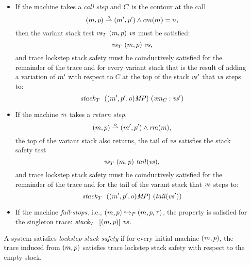 \documentclass[acmsmall,review,anonymous]{acmart}\settopmatter{printfolios=true,printccs=false,printacmref=false}
\begin{document}
{\begin{itemize}
\item
  If the machine takes a \emph{call step} and $C$ is the contour at
  the call
  \[(m, p) \overset{o}{\rightharpoonup} (m', p') \wedge cm(m) = n,\]
%
  then the variant stack test $\mathit{\mathit{vs}}_T ~ (m, p) ~ \mathit{vs}$ must be
  satisfied:
  \[\mathit{\mathit{vs}}_T ~ (m, p) ~ \mathit{vs},\]
%
%
  and trace lockstep stack safety must be coinductively satisfied
  for the remainder of the trace and for every variant stack
  that is the result of adding a variation of $m'$ with
  respect to $C$ at the top of the stack $\mathit{vs}'$ that $\mathit{vs}$ steps
  to:
  \[\mathit{stack}_T ~  ~ ((m', p', o)\mathit{MP}) ~ (\mathit{vm}_{C} : \mathit{vs}')\]

\item
%
  If the machine $m$ takes a \emph{return step},
  \[(m, p) \overset{o}{\rightharpoonup} (m', p') \wedge \mathit{rm}(m),\]
  the top of the variant stack also returns,
  the tail of $\mathit{vs}$ satisfies the stack safety test
  \[\mathit{\mathit{vs}}_T ~ (m, p) ~ \mathit{tail}(\mathit{vs}),\]
  and trace lockstep stack safety must be coinductively satisfied for
  the remainder of the trace and for the tail of the varant stack
  that $\mathit{vs}$ steps to:
  \[\mathit{stack}_T ~  ~ ((m', p', o)\mathit{MP}) ~ (\mathit{tail}(\mathit{vs}'))\]

\item If the machine \emph{fail-stops}, i.e., $(m, p) \hookrightarrow_P
    (m, p, \tau)$, the property is safisfied for the singleton trace:
    $\mathit{stack}_T ~  ~ [(m, p)] ~ \mathit{vs}$.


  \end{itemize}

%
A system satisfies {\em lockstep stack safety} if for every initial machine $(m,p)$,
the trace induced from $(m, p)$ satisfies trace lockstep stack safety with
respect to the empty stack.

}
\end{document}
